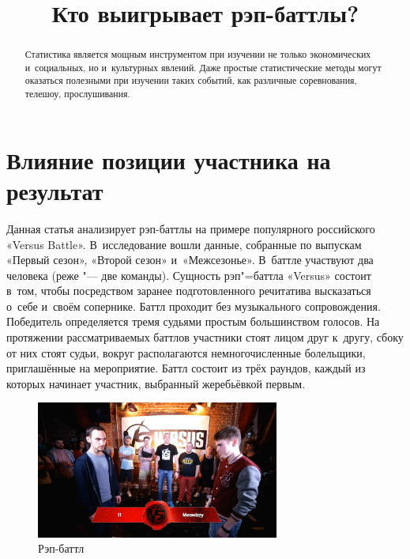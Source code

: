 \documentclass[final,pdftex]{../../template/epsilonj}
\numberwithin{equation}{section}
\begin{document}
\begin{frontmatter}
\title{Кто выигрывает рэп-баттлы?}

\begin{aug}
\author{ }%


\address{НИУ ВШЭ, Москва.}
\end{aug}

\begin{abstract}
	Статистика является мощным инструментом при изучении не только экономических и~социальных, но и~культурных явлений. Даже простые статистические методы могут оказаться полезными при изучении таких событий, как различные соревнования, телешоу, прослушивания.
\end{abstract}

\begin{keyword}
\end{keyword}

\end{frontmatter}


\section{Влияние позиции участника на результат}

Данная статья анализирует рэп-баттлы на примере популярного российского «Versus Battle». В~исследование вошли данные, собранные по выпускам «Первый сезон», «Второй сезон» и~«Межсезонье». В~баттле участвуют два человека (реже "--- две команды). Сущность рэп"=баттла «Versus» состоит в~том, чтобы посредством заранее подготовленного речитатива высказаться о~себе и~своём сопернике. Баттл проходит без музыкального сопровождения. Победитель определяется тремя судьями простым большинством голосов. На протяжении рассматриваемых баттлов участники стоят лицом друг к~другу, сбоку от них стоят судьи, вокруг располагаются немногочисленные болельщики, приглашённые на мероприятие. Баттл состоит из трёх раундов, каждый из которых начинает участник, выбранный жеребьёвкой первым.

\begin{figure}[htbp]
	\centering
	\includegraphics[width=8cm]{maxresdefault.jpg}
	\caption{Рэп-баттл}
\end{figure}
\end{document}
